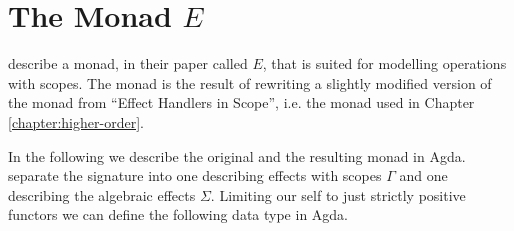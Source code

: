 \section{The Monad $E$}
\label{chapter:scoped-algebras:monad-e}

\textcite{DBLP:conf/lics/PirogSWJ18} describe a monad, in their paper called
$E$, that is suited for modelling operations with scopes.
The monad is the result of rewriting a slightly modified version of the monad
from ``Effect Handlers in Scope'', i.e. the monad used in Chapter
\ref{chapter:higher-order}.

In the following we describe the original and the resulting monad in Agda.
\textcite{DBLP:conf/lics/PirogSWJ18} separate the signature into one describing
effects with scopes $\Gamma$ and one describing the algebraic effects $\Sigma$.
Limiting our self to just strictly positive functors we can define the following
data type in Agda.

